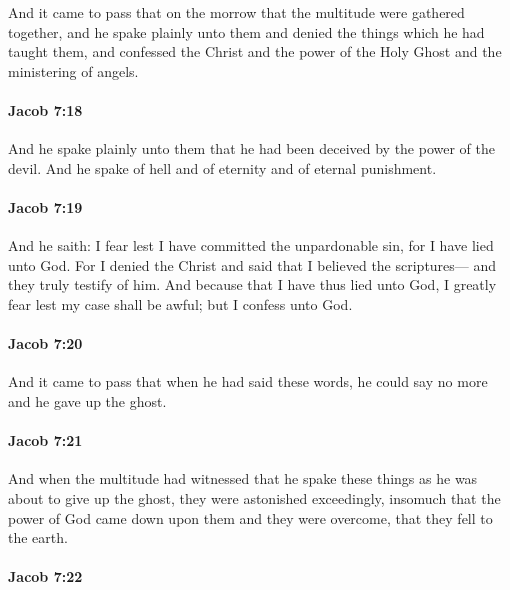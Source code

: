 			And it came to pass that on the morrow that the multitude were gathered together,
			and he spake plainly unto them and denied the things which he had taught them,
			and confessed the Christ and the power of the Holy Ghost
			and the ministering of angels.

		\paragraph{Jacob 7:18} %
			\label{JACOB-7-18}

			And he spake plainly unto them
			that he had been deceived by the power of the devil.
			And he spake of hell and of eternity and of eternal punishment.

		\paragraph{Jacob 7:19} %
			\label{JACOB-7-19}

			And he saith:
			I fear lest I have committed the unpardonable sin,
			for I have lied unto God.
			For I denied the Christ and said that I believed the scriptures---
			and they truly testify of him.
			And because that I have thus lied unto God,
			I greatly fear lest my case shall be awful;
			but I confess unto God.

		\paragraph{Jacob 7:20} %
			\label{JACOB-7-20}

			And it came to pass that when he had said these words,
			he could say no more and he gave up the ghost.

		\paragraph{Jacob 7:21} %
			\label{JACOB-7-21}

			And when the multitude had witnessed
			that he spake these things as he was about to give up the ghost,
			they were astonished exceedingly,
			insomuch that the power of God came down upon them
			and they were overcome, that they fell to the earth.

		\paragraph{Jacob 7:22} %
			\label{JACOB-7-22}

